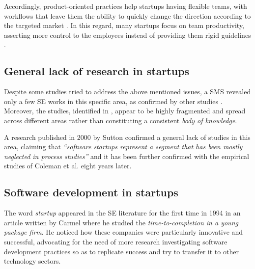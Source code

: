 \documentclass[10pt,journal,letterpaper,compsoc]{IEEEtran}
\begin{document}
Accordingly, product-oriented practices help startups having flexible teams, 
with workflows that leave them the ability to quickly change the direction 
according to the targeted market  \cite{Heitlager2007,Sutton2000}. In this 
regard, many startups focus on team productivity, asserting more control to the 
employees instead of providing them rigid guidelines \cite{Tanabian2005, 
Chorev2006, Kakati2003}. 

\subsection{General lack of research in startups}
Despite some studies tried to address the above mentioned issues, a SMS 
\cite{SMS} revealed only a few SE works in this specific area, as confirmed by 
other studies \cite{Coleman2008, Coleman2008a, Coleman2007, Sutton2000}. 
Moreover, the studies, identified in \cite{SMS}, appear to be highly fragmented 
and spread across different areas rather than constituting a consistent 
\textit{body of knowledge}.

A research published in 2000 by Sutton \cite{Sutton2000} confirmed a general 
lack of  studies in this area, claiming that \textit{``software startups 
represent a segment that has been mostly neglected in process studies''} and it 
has been further confirmed with the empirical studies of Coleman et al. 
\cite{Coleman2008,Coleman2008a,Coleman2007} eight years later.

\subsection{Software development in startups}

The word \textit{startup} appeared in the SE literature for the first time in 
1994 in an article written by Carmel \cite{Camel1994a} where he studied the 
\textit{time-to-completion in a young package firm}. %
He noticed how these companies were particularly innovative and successful, 
advocating for the need of more research investigating software development 
practices so as to replicate success and try to transfer it to other technology 
sectors.
\end{document}
